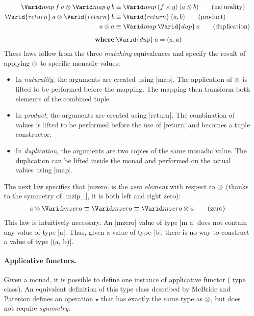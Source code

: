 \documentclass{sigplanconf}
\begin{document}
\begin{align*}
  \map \: f \: a \mzip \map \: g \: b &\equiv \map \: (f \times g) \: (a \mzip b) \tag{naturality} \\
  \Varid{return} \: a \mzip \Varid{return} \: b &\equiv \Varid{return} \: (a, b) \tag{product} \\
  a \mzip a &\equiv \map \: \Varid{dup} \: a \tag{duplication} \\
\\[-10pt]
  \textbf{where} & \: \Varid{dup} \: a = (a, a)
\end{align*}
These laws follow from the three \textit{matching} equivalences and specify the result of
applying $\otimes$ to specific monadic values:
\begin{itemize}
\item In \textit{naturality}, the arguments are created using |map|. The application of $\otimes$ is
  lifted to be performed before the mapping. The mapping then transform both elements of the 
  combined tuple.
  
\item In \textit{product}, the arguments are created using |return|. The combination of values is
  lifted to be performed before the use of |return| and becomes a tuple constructor.

\item In \textit{duplication}, the arguments are two copies of the same monadic value. The 
  duplication can be lifted inside the monad and performed on the actual values using |map|.

\end{itemize}
The next law specifies that |mzero| is the \textit{zero element} with respect to $\otimes$
(thanks to the symmetry of |mzip_|, it is both left and right zero):
\begin{align*}
  a \mzip \mzero \equiv \mzero \equiv \mzero \mzip a \tag {zero} 
\end{align*}
This law is intuitively necessary. An |mzero| value of type |m a| does not contain any value of type
|a|. Thus, given a value of type |b|, there is no way to construct a value of type |(a, b)|.

\paragraph{Applicative functors.} Given a monad, it is possible to define one instance of applicative
functor ( type class). An equivalent definition of this type class described
by McBride and Paterson \cite{applicative} defines an operation $\star$ that has exactly 
the same type as $\otimes$, but  does not require \textit{symmetry}. 
\end{document}
